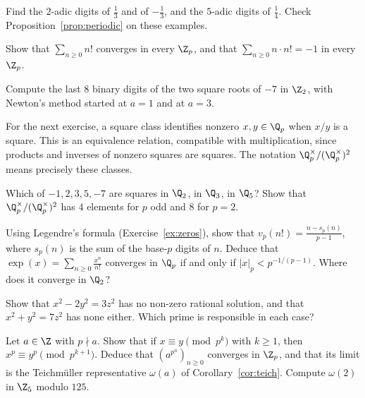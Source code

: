\begin{exercise}[$\star$]\label{ex:padicdigits}
Find the $2$-adic digits of $\frac13$ and of $-\frac13$, and the $5$-adic digits of $\frac14$. Check Proposition~\ref{prop:periodic} on these examples.
\end{exercise}

\begin{exercise}[$\star$]\label{ex:nfact}
Show that $\sum_{n\ge0}n!$ converges in every $\Z_p$, and that $\sum_{n\ge0}n\cdot n!=-1$ in every $\Z_p$.
\end{exercise}

\begin{exercise}[$\star$]\label{ex:sqrtm7}
Compute the last $8$ binary digits of the two square roots of $-7$ in $\Z_2$, with Newton's method started at $a=1$ and at $a=3$.
\end{exercise}

For the next exercise, a square class identifies nonzero $x,y\in\Q_p$
when $x/y$ is a square. This is an equivalence relation, compatible with
multiplication, since products and inverses of nonzero squares are squares.
The notation $\Q_p^\times/(\Q_p^\times)^2$ means precisely these classes.

\begin{exercise}[$\star\star$]\label{ex:sqclasses}
Which of $-1,2,3,5,-7$ are squares in $\Q_2$, in $\Q_3$, in $\Q_5$? Show that $\Q_p^\times/(\Q_p^\times)^2$ has $4$ elements for $p$ odd and $8$ for $p=2$.
\end{exercise}

\begin{exercise}[$\star\star$]\label{ex:padicexp}
Using Legendre's formula (Exercise~\ref{ex:zeros}), show that $v_p(n!)=\frac{n-s_p(n)}{p-1}$, where $s_p(n)$ is the sum of the base-$p$ digits of $n$. Deduce that $\exp(x)=\sum_{n\ge0}\frac{x^n}{n!}$ converges in $\Q_p$ if and only if $|x|_p<p^{-1/(p-1)}$. Where does it converge in $\Q_2$?
\end{exercise}

\begin{exercise}[$\star\star$]\label{ex:hasse}
Show that $x^2-2y^2=3z^2$ has no non-zero rational solution, and that $x^2+y^2=7z^2$ has none either. Which prime is responsible in each case?
\end{exercise}

\begin{exercise}[$\star\star\star$]\label{ex:teich}
Let $a\in\Z$ with $p\nmid a$. Show that if $x\equiv y\pmod{p^k}$ with $k\ge1$, then $x^p\equiv y^p\pmod{p^{k+1}}$. Deduce that $(a^{p^n})_{n\ge0}$ converges in $\Z_p$, and that its limit is the Teichm\"uller representative $\omega(a)$ of Corollary~\ref{cor:teich}. Compute $\omega(2)$ in $\Z_5$ modulo $125$.
\end{exercise}

